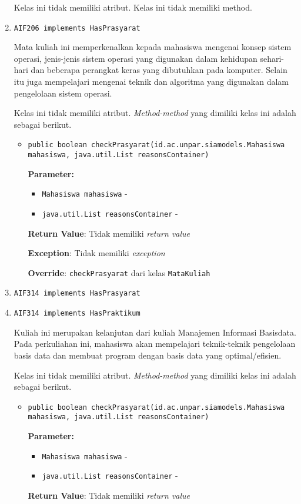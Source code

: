 \documentclass{article}
\begin{document}
\begin{enumerate}
Kelas ini tidak memiliki atribut. Kelas ini tidak memiliki method. \item \texttt{AIF206 implements HasPrasyarat}

Mata kuliah ini memperkenalkan kepada mahasiswa mengenai konsep sistem 
 operasi, jenis-jenis sistem operasi yang digunakan dalam kehidupan 
 sehari-hari dan beberapa perangkat keras yang dibutuhkan pada komputer. 
 Selain itu juga mempelajari mengenai teknik dan algoritma yang digunakan 
 dalam pengelolaan sistem operasi.

Kelas ini tidak memiliki atribut. \textit{Method-method} yang dimiliki kelas ini adalah sebagai berikut.
\begin{itemize}
\item \texttt{public boolean checkPrasyarat(id.ac.unpar.siamodels.Mahasiswa mahasiswa, java.util.List reasonsContainer)}



\textbf{Parameter:}
\begin{itemize}
\item \texttt{Mahasiswa mahasiswa} - 
\item \texttt{java.util.List reasonsContainer} - 
\end{itemize}
\textbf{Return Value}: Tidak memiliki \textit{return value}

\textbf{Exception}: Tidak memiliki \textit{exception}

\textbf{Override}: \texttt{checkPrasyarat} dari kelas \texttt{MataKuliah}

\end{itemize}
\item \texttt{AIF314 implements HasPrasyarat}

\item \texttt{AIF314 implements HasPraktikum}

Kuliah ini merupakan kelanjutan dari kuliah Manajemen Informasi Basisdata.
 Pada perkuliahan ini, mahasiswa akan mempelajari teknik-teknik pengelolaan
 basis data dan membuat program dengan basis data yang optimal/efisien.

Kelas ini tidak memiliki atribut. \textit{Method-method} yang dimiliki kelas ini adalah sebagai berikut.
\begin{itemize}
\item \texttt{public boolean checkPrasyarat(id.ac.unpar.siamodels.Mahasiswa mahasiswa, java.util.List reasonsContainer)}



\textbf{Parameter:}
\begin{itemize}
\item \texttt{Mahasiswa mahasiswa} - 
\item \texttt{java.util.List reasonsContainer} - 
\end{itemize}
\textbf{Return Value}: Tidak memiliki \textit{return value}


\end{itemize}
\end{enumerate}
\end{document}
